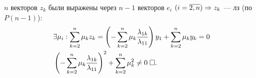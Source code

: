 \documentclass{article}
\begin{document}
\begin{enumerate}
\begin{enumerate}
		$n$ векторов $z_{k}$ были выражены через $n-1$ векторов $e_{i}$ $(i=\overline{2,n})\Rarr z_{k}$ --- лз (по $P(n-1)$):
		\begin{align*}
			 & \exists\mu_{i}:\sum_{k=2}^{n}\mu_{k}z_{k}=\left(-\sum_{k=2}^{n}\mu_{k}\frac{\lambda_{1k}}{\lambda_{11}}\right)y_1+\sum_{k=2}^{n}\mu_{k}y_{k}=0 \\
			 & \left(-\sum_{k=2}^{n}\mu_{k}\frac{\lambda_{1k}}{\lambda_{11}}\right)^{2}+\sum_{k=2}^{n}\mu_{k}^{2}\neq 0\qed
		\end{align*}
	\end{enumerate}

\end{enumerate}
\end{document}
